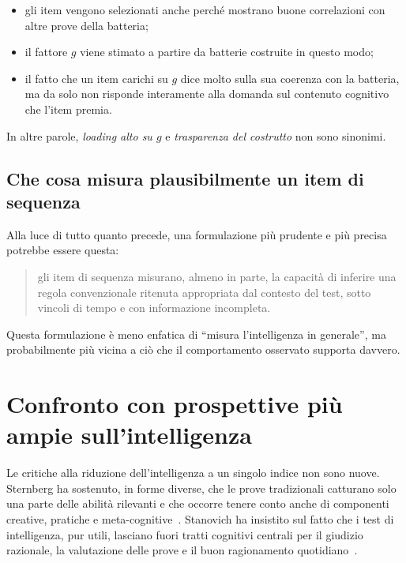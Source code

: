 \documentclass[10pt, a4paper]{article}
\theoremstyle{plain}
\theoremstyle{definition}
\theoremstyle{remark}
\begin{document}
\begin{itemize}
    \item gli item vengono selezionati anche perché mostrano buone correlazioni
          con altre prove della batteria;
    \item il fattore $g$ viene stimato a partire da batterie costruite in questo
          modo;
    \item il fatto che un item carichi su $g$ dice molto sulla sua coerenza con
          la batteria, ma da solo non risponde interamente alla domanda sul
          contenuto cognitivo che l'item premia.
\end{itemize}

In altre parole, \emph{loading alto su $g$} e \emph{trasparenza del costrutto}
non sono sinonimi.

\subsection{Che cosa misura plausibilmente un item di sequenza}

Alla luce di tutto quanto precede, una formulazione più prudente e più precisa
potrebbe essere questa:

\begin{quote}
gli item di sequenza misurano, almeno in parte, la capacità di inferire una
regola convenzionale ritenuta appropriata dal contesto del test, sotto vincoli
di tempo e con informazione incompleta.
\end{quote}

Questa formulazione è meno enfatica di ``misura l'intelligenza in generale'',
ma probabilmente più vicina a ciò che il comportamento osservato supporta
davvero.

\section{Confronto con prospettive più ampie sull'intelligenza}
\label{sec:broader}

Le critiche alla riduzione dell'intelligenza a un singolo indice non sono nuove.
Sternberg ha sostenuto, in forme diverse, che le prove tradizionali catturano
solo una parte delle abilità rilevanti e che occorre tenere conto anche di
componenti creative, pratiche e meta-cognitive~\cite{sternberg1985,
sternberg1999}. Stanovich ha insistito sul fatto che i test di intelligenza,
pur utili, lasciano fuori tratti cognitivi centrali per il giudizio razionale,
la valutazione delle prove e il buon ragionamento quotidiano~\cite{stanovich2009}.
\end{document}
